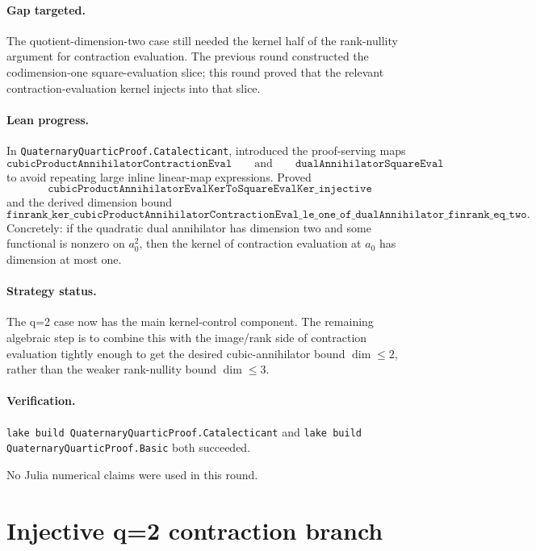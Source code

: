 \documentclass[11pt]{article}
\begin{document}
\paragraph{Gap targeted.}
The quotient-dimension-two case still needed the kernel half of the
rank-nullity argument for contraction evaluation.  The previous round
constructed the codimension-one square-evaluation slice; this round proved
that the relevant contraction-evaluation kernel injects into that slice.

\paragraph{Lean progress.}
In \texttt{QuaternaryQuarticProof.Catalecticant}, introduced the proof-serving
maps
\[
\texttt{cubicProductAnnihilatorContractionEval}
\qquad\text{and}\qquad
\texttt{dualAnnihilatorSquareEval}
\]
to avoid repeating large inline linear-map expressions.  Proved
\[
\texttt{cubicProductAnnihilatorEvalKerToSquareEvalKer\_injective}
\]
and the derived dimension bound
\[
\texttt{finrank\_ker\_cubicProductAnnihilatorContractionEval\_le\_one\_of\_dualAnnihilator\_finrank\_eq\_two}.
\]
Concretely: if the quadratic dual annihilator has dimension two and some
functional is nonzero on \(a_0^2\), then the kernel of contraction evaluation
at \(a_0\) has dimension at most one.

\paragraph{Strategy status.}
The q=2 case now has the main kernel-control component.  The remaining
algebraic step is to combine this with the image/rank side of contraction
evaluation tightly enough to get the desired cubic-annihilator bound
\(\dim \le 2\), rather than the weaker rank-nullity bound \(\dim \le 3\).

\paragraph{Verification.}
\texttt{lake build QuaternaryQuarticProof.Catalecticant} and
\texttt{lake build QuaternaryQuarticProof.Basic} both succeeded.

No Julia numerical claims were used in this round.

\section*{Injective q=2 contraction branch}
\end{document}
